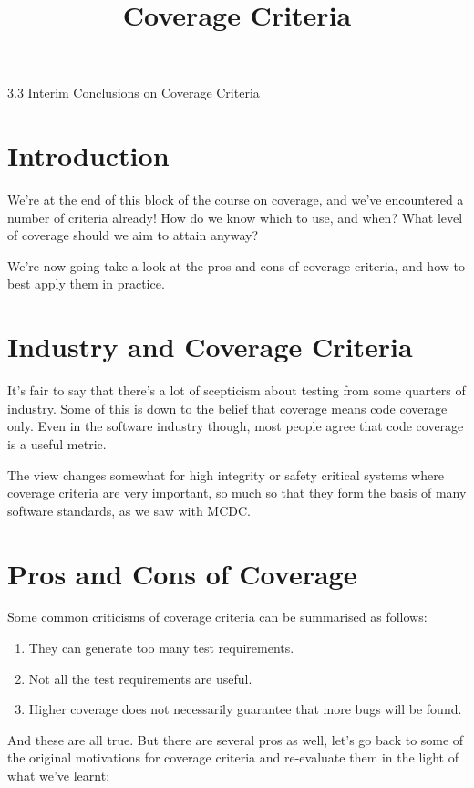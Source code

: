 



\title{Coverage Criteria}{3.3 Interim Conclusions on Coverage Criteria}

\section{Introduction}

We're at the end of this block of the course on coverage, and we've encountered
a number of criteria already! How do we know which to use, and when? What level
of coverage should we aim to attain anyway? 

We're now going take a look at the pros and cons of coverage criteria, and how
to best apply them in practice.

\section{Industry and Coverage Criteria}

It's fair to say that there's a lot of scepticism about testing from some
quarters of industry. Some of this is down to the belief that coverage means
code coverage only. Even in the software industry though, most people agree that
code coverage is a useful metric.

The view changes somewhat for high integrity or safety critical systems where
coverage criteria are very important, so much so that they form the basis of
many software standards, as we saw with MCDC.

\section{Pros and Cons of Coverage}

Some common criticisms of coverage criteria can be summarised as follows:

\begin{enumerate}
    \item They can generate too many test requirements.
    \item Not all the test requirements are useful.
    \item Higher coverage does not necessarily guarantee that more bugs will be
    found.
\end{enumerate}

And these are all true. But there are several pros as well, let's go back to
some of the original motivations for coverage criteria and re-evaluate them in
the light of what we've learnt:

